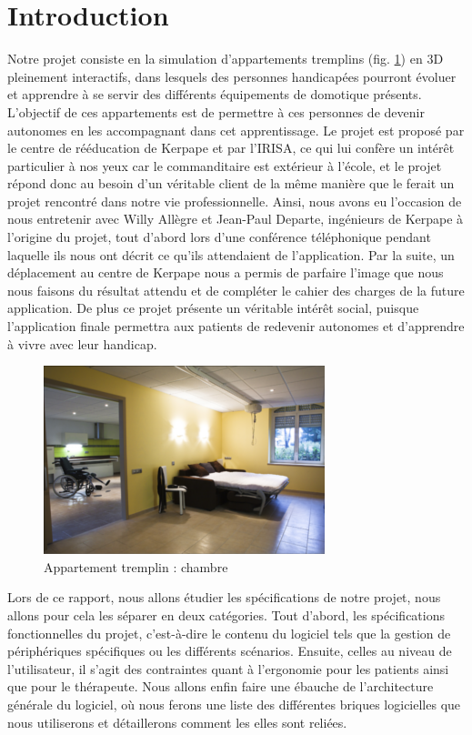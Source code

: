 \section{Introduction}



Notre projet consiste en la simulation d'appartements tremplins (fig. \ref{appart}) en 3D pleinement interactifs, dans lesquels des personnes handicapées pourront évoluer et apprendre à se servir des différents équipements de domotique présents. L'objectif de ces appartements est de permettre à ces personnes de devenir autonomes en les accompagnant dans cet apprentissage.
Le projet est proposé par le centre de rééducation de Kerpape et par l'IRISA, ce qui lui confère un intérêt particulier à nos yeux car le commanditaire est extérieur à l'école, et le projet répond donc au besoin d'un véritable client de la même manière que le ferait un projet rencontré dans notre vie professionnelle. 
Ainsi, nous avons eu l'occasion de nous entretenir avec Willy Allègre et Jean-Paul Departe, ingénieurs de Kerpape à l'origine du projet, tout d'abord lors d'une conférence téléphonique pendant laquelle ils nous ont décrit ce qu'ils attendaient de l'application. Par la suite, un déplacement au centre de Kerpape nous a permis de parfaire l'image que nous nous faisons du résultat attendu et de compléter le cahier des charges de la future application. 
De plus ce projet présente un véritable intérêt social, puisque l'application finale permettra aux patients de redevenir autonomes et d'apprendre à vivre avec leur handicap.


\begin{figure}[h]
	\centering
	\includegraphics[scale=1]{1-PreEtude/img/appt_tremplin_intro.png}
	\caption{Appartement tremplin : chambre}
	\label{appart}
\end{figure}

Lors de ce rapport, nous allons étudier les spécifications de notre projet, nous allons pour cela les séparer en deux catégories. Tout d'abord, les spécifications fonctionnelles du projet, c'est-à-dire le contenu du logiciel tels que la gestion de périphériques spécifiques ou les différents scénarios. Ensuite, celles au niveau de l'utilisateur, il s'agit des contraintes quant à l'ergonomie pour les patients ainsi que pour le thérapeute. Nous allons enfin faire une ébauche de l'architecture générale du logiciel, où nous ferons une liste des différentes briques logicielles que nous utiliserons et détaillerons comment les elles sont reliées.


